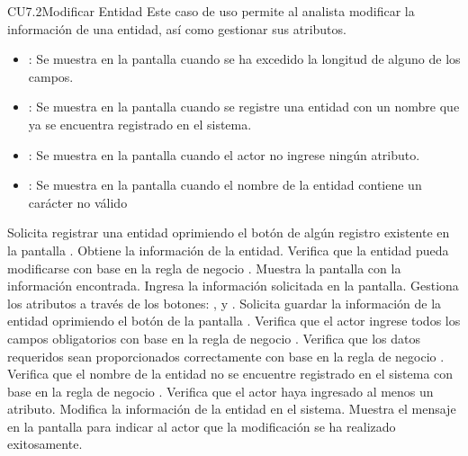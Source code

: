 \begin{UseCase}{CU7.2}{Modificar Entidad}{
		Este caso de uso permite al analista modificar la información de una entidad, así como gestionar sus atributos.
	}
{\begin{itemize}
		\item {}: Se muestra en la pantalla  cuando se ha excedido la longitud de alguno de los campos.
		\item {}: Se muestra en la pantalla  cuando se registre una entidad con un nombre que ya se encuentra registrado en el sistema.
		\item {}: Se muestra en la pantalla  cuando el actor no ingrese ningún atributo.
		\item {}: Se muestra en la pantalla  cuando el nombre de la entidad contiene un carácter no válido
		\end{itemize}
		}
	\end{UseCase}
	\begin{UCtrayectoria}
		\UCpaso[\UCactor] Solicita registrar una entidad oprimiendo el botón \editar de algún registro existente en la pantalla .
		\UCpaso[\UCsist] Obtiene la información de la entidad.
		\UCpaso[\UCsist] Verifica que la entidad pueda modificarse con base en la regla de negocio . 
		\UCpaso[\UCsist] Muestra la pantalla  con la información encontrada.
		\UCpaso[\UCactor] Ingresa la información solicitada en la pantalla. \label{CU7.2-P5}
		\UCpaso[\UCactor] Gestiona los atributos a través de los botones: , \editar y \eliminar. \label{CU7.2-P6}
		\UCpaso[\UCactor] Solicita guardar la información de la entidad oprimiendo el botón  de la pantalla . 
		\UCpaso[\UCsist] Verifica que el actor ingrese todos los campos obligatorios con base en la regla de negocio . 
		\UCpaso[\UCsist] Verifica que los datos requeridos sean proporcionados correctamente con base en la regla de negocio .  
		\UCpaso[\UCsist] Verifica que el nombre de la entidad no se encuentre registrado en el sistema con base en la regla de negocio .  
		\UCpaso[\UCsist] Verifica que el actor haya ingresado al menos un atributo. 
		\UCpaso[\UCsist] Modifica la información de la entidad en el sistema.
		\UCpaso[\UCsist] Muestra el mensaje  en la pantalla  para indicar al actor que la modificación se ha realizado exitosamente.
	\end{UCtrayectoria}		
	
